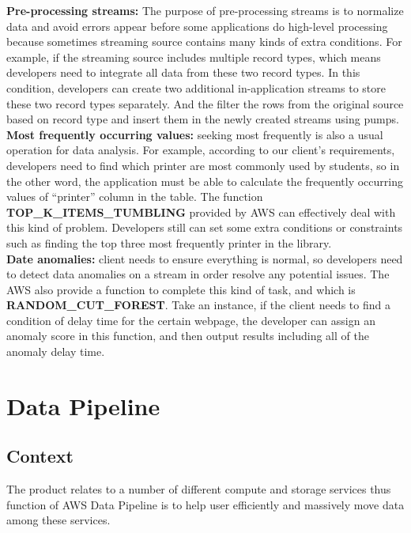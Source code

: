 	\noindent \textbf{Pre-processing streams:} The purpose of pre-processing streams is to normalize data and avoid errors appear before some applications do high-level processing because sometimes streaming source contains many kinds of extra conditions. For example, if the streaming source includes multiple record types, which means developers need to integrate all data from these two record types. In this condition, developers can create two additional in-application streams to store these two record types separately. And the filter the rows from the original source based on record type and insert them in the newly created streams using pumps.\cite{z4}\\

	\noindent \textbf{Most frequently occurring values:} seeking most frequently is also a usual operation for data analysis. For example, according to our client’s requirements, developers need to find which printer are most commonly used by students, so in the other word, the application must be able to calculate the frequently occurring values of “printer” column in the table. The function \textbf{TOP\_K\_ITEMS\_TUMBLING} provided by AWS can effectively deal with this kind of problem. Developers still can set some extra conditions or constraints such as finding the top three most frequently printer in the library.\\

	\noindent \textbf{Date anomalies:} client needs to ensure everything is normal, so developers need to detect data anomalies on a stream in order resolve any potential issues. The AWS also provide a function to complete this kind of task, and which is \textbf{RANDOM\_CUT\_FOREST}. Take an instance, if the client needs to find a condition of delay time for the certain webpage, the developer can assign an anomaly score in this function, and then output results including all of the anomaly delay time.
       
\section{Data Pipeline}
	\subsection{Context}
    The product relates to a number of different compute and storage services thus function of AWS Data Pipeline is to help user efficiently and massively move data among these services.
     
